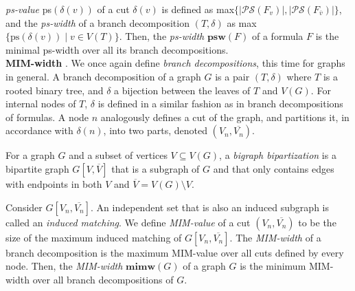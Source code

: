 {\em ps-value} ps$(\delta(v))$ of a cut $\delta(v)$ is defined as max$\{|\mathcal{PS}(F_v)|, |\mathcal{PS}(F_{\overline{v}})|\}$, and the {\em ps-width} of a branch decomposition $(T,\delta)$ as max$\{ \text{ps}(\delta(v)) \; | \; v \in V(T) \}$. 
Then, the {\em ps-width} $\mathbf{psw}(F)$ of a formula $F$ is the minimal ps-width over all its branch decompositions.\\

\noindent
\textbf{MIM-width} \cite{DBLP:conf/sat/SaetherTV14, PhD:Vatshelle}.
We once again define {\em branch decompositions}, this time for graphs in general.
A branch decomposition of a graph $G$ is a pair $(T, \delta)$ where $T$ is a rooted binary tree, and $\delta$ a bijection between the leaves of $T$ and $V(G).$
For internal nodes of $T$, $\delta$ is defined in a similar fashion as in branch decompositions of formulas.
A node $n$ analogously defines a cut of the graph, and partitions it, in accordance with $\delta(n)$, into two parts, denoted $(V_n, \overline{V_n})$.

For a graph $G$ and a subset of vertices $V \subseteq V(G)$, a {\em bigraph bipartization} is a bipartite graph $G[V, \overline{V}]$ that is a subgraph of $G$ and that only contains edges with endpoints in both $V$ and $\overline{V} = V(G) \setminus V$.

Consider $G[V_n, \overline{V_n}]$.
An independent set that is also an induced subgraph is called an {\em induced matching}.
We define {\em MIM-value} of a cut $(V_n, \overline{V_n})$ to be the size of the maximum induced matching of $G[V_n, \overline{V_n}]$.
The {\em MIM-width} of a branch decomposition is the maximum MIM-value over all cuts defined by every node.
Then, the {\em MIM-width} $\mathbf{mimw}(G)$ of a graph $G$ is the minimum MIM-width over all branch decompositions of $G$.\\

